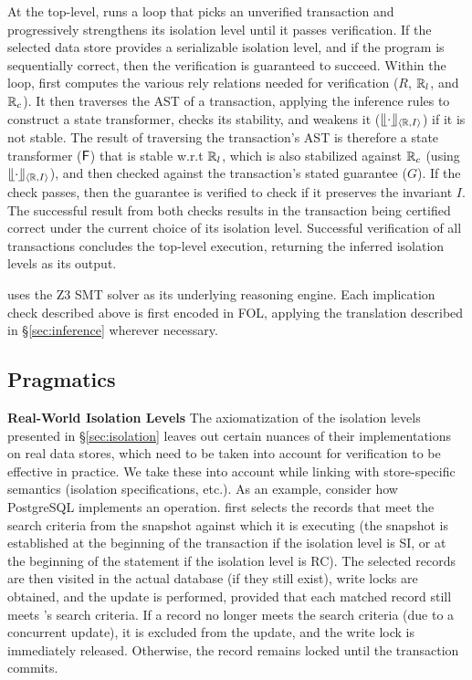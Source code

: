 At the top-level, \thetool runs a loop that picks an unverified
transaction and progressively strengthens its isolation level until it
passes verification. If the selected data store provides a
serializable isolation level, and if the program is sequentially
correct, then the verification is guaranteed to succeed. Within the
loop, \thetool first computes the various rely relations needed for
verification ($R$, $\mathbb{R}_l$, and $\mathbb{R}_c$). It then traverses the AST of a
transaction, applying the inference rules to construct a state
transformer, checks its stability, and weakens it ($\llfloor \cdot \rrfloor_{\langle \mathbb{R},I \rangle}$)
if it is not stable. The result of traversing the transaction's AST is
therefore a state transformer (${\sf F}$) that is stable w.r.t $\mathbb{R}_l$, which
is also stabilized against $\mathbb{R}_c$ (using $\llfloor \cdot \rrfloor_{\langle \mathbb{R},I \rangle}$), and
then checked against the transaction's stated guarantee ($G$). If the
check passes, then the guarantee is verified to check if it preserves
the invariant $I$. The successful result from both checks results
in the transaction being certified correct under the current choice of
its isolation level. Successful verification of all transactions
concludes the top-level execution, returning the inferred isolation
levels as its output.

\thetool uses the Z3 SMT solver as its underlying reasoning engine. Each
implication check described above is first encoded in FOL, applying
the translation described in \S\ref{sec:inference} wherever
necessary.

\subsection{Pragmatics}

\textbf{Real-World Isolation Levels} The axiomatization of the
isolation levels presented in \S\ref{sec:isolation} leaves out
certain nuances of their implementations on real data stores, which
need to be taken into account for verification to be effective in
practice.  We take these into account while linking \thetool with
store-specific semantics (isolation specifications, etc.). As an
example, consider how PostgreSQL implements an  operation.
 first selects the records that meet the search criteria
from the snapshot against which it is executing (the snapshot is
established at the beginning of the transaction if the isolation level
is SI, or at the beginning of the  statement if the
isolation level is RC). The selected records are then visited in the
actual database (if they still exist), write locks are obtained, and
the update is performed, provided that each matched record still meets
's search criteria. If a record no longer meets the
search criteria (due to a concurrent update), it is excluded
from the update, and the write lock is immediately released.
Otherwise, the record remains locked until the transaction commits. 

